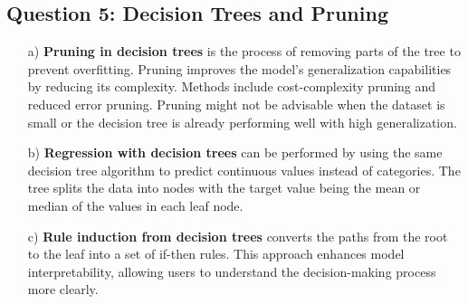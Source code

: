 \documentclass{article}
\begin{document}
\subsection*{Question 5: Decision Trees and Pruning}
\begin{enumerate}
    \item[a)] \textbf{Pruning in decision trees} is the process of removing parts of the tree to prevent overfitting. Pruning improves the model's generalization capabilities by reducing its complexity. Methods include cost-complexity pruning and reduced error pruning. Pruning might not be advisable when the dataset is small or the decision tree is already performing well with high generalization.
    \item[b)] \textbf{Regression with decision trees} can be performed by using the same decision tree algorithm to predict continuous values instead of categories. The tree splits the data into nodes with the target value being the mean or median of the values in each leaf node.
    \item[c)] \textbf{Rule induction from decision trees} converts the paths from the root to the leaf into a set of if-then rules. This approach enhances model interpretability, allowing users to understand the decision-making process more clearly.
\end{enumerate}
\end{document}
